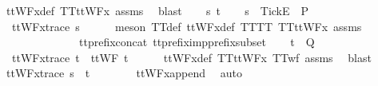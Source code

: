 \begin{isabellebody}
{\ ttWFx{\isacharunderscore}def\ TT{\isacharunderscore}ttWFx\ assms{\isacharparenleft}{}{\isacharparenright}\ \isamarkupfalse%
\ blast\isanewline
{}\isamarkupfalse%
\isanewline
\ \ \isamarkupfalse%
\ s\ t\isanewline
\ \ \isamarkupfalse%
\ {\isachardoublequoteopen}s\ {\isacharat}\ {\isacharbrackleft}{\isacharbrackleft}Tick{\isacharbrackright}\isactrlsub E{\isacharbrackright}\ {\isasymin}\ P{\isachardoublequoteclose}\isanewline
\ \ \isamarkupfalse%
\ \isamarkupfalse%
\ {}{\isacharcolon}\ {\isachardoublequoteopen}ttWFx{\isacharunderscore}trace\ s{\isachardoublequoteclose}\isanewline
\ \ \ \ \isamarkupfalse%
\ {\isacharparenleft}meson\ TT{}{\isacharunderscore}def\ ttWFx{\isacharunderscore}def\ TT{\isacharunderscore}TT{}\ TT{\isacharunderscore}ttWFx\ assms{\isacharparenleft}{}{\isacharparenright}\ \isanewline
\ \ \ \ \ \ \ \ \ \ \ \ \ \ tt{\isacharunderscore}prefix{\isacharunderscore}concat\ tt{\isacharunderscore}prefix{\isacharunderscore}imp{\isacharunderscore}prefix{\isacharunderscore}subset{\isacharparenright}\isanewline
\ \ \isamarkupfalse%
\ {\isachardoublequoteopen}t\ {\isasymin}\ Q{\isachardoublequoteclose}\isanewline
\ \ \isamarkupfalse%
\ \isamarkupfalse%
\ {}{\isacharcolon}\ {\isachardoublequoteopen}ttWFx{\isacharunderscore}trace\ t\ {\isasymand}\ ttWF\ t{\isachardoublequoteclose}\isanewline
\ \ \ \ \isamarkupfalse%
\ ttWFx{\isacharunderscore}def\ TT{\isacharunderscore}ttWFx\ TT{\isacharunderscore}wf\ assms{\isacharparenleft}{}{\isacharparenright}\ \isamarkupfalse%
\ blast\isanewline
\ \ \isamarkupfalse%
\ {\isachardoublequoteopen}ttWFx{\isacharunderscore}trace\ {\isacharparenleft}s\ {\isacharat}\ t{\isacharparenright}{\isachardoublequoteclose}\isanewline
\ \ \ \ \isamarkupfalse%
\ {}\ {}\ ttWFx{\isacharunderscore}append\ \isamarkupfalse%
\ auto\isanewline
{}\isamarkupfalse%
%
\endisatagproof
{\isafoldproof}%
%
\isadelimproof
%
\endisadelimproof
%
}%
%
\end{isabellebody}
